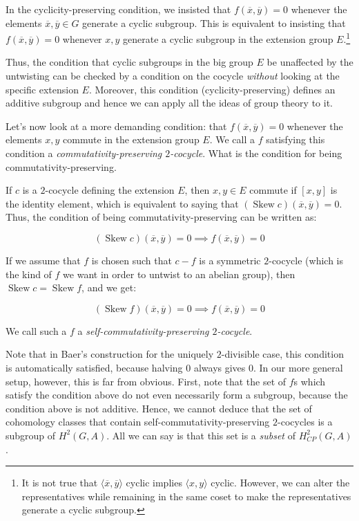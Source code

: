 \documentclass[10pt]{amsart}
\newcommand{\Skew}{\operatorname{Skew}}
\begin{document}
In the cyclicity-preserving condition, we insisted that
$f(\overline{x},\overline{y}) = 0$ whenever the elements
$\overline{x},\overline{y} \in G$ generate a cyclic subgroup. This is
equivalent to insisting that $f(\overline{x},\overline{y}) = 0$
whenever $x,y$ generate a cyclic subgroup in the extension group
$E$.\footnote{It is not true that $\langle \overline{x},\overline{y}
\rangle$ cyclic implies $\langle x,y \rangle$ cyclic. However, we can
alter the representatives while remaining in the same coset to make
the representatives generate a cyclic subgroup.}

Thus, the condition that cyclic subgroups in the big group $E$ be
unaffected by the untwisting can be checked by a condition on the
cocycle {\em without} looking at the specific extension $E$. Moreover,
this condition (cyclicity-preserving) defines an additive subgroup and
hence we can apply all the ideas of group theory to it.

Let's now look at a more demanding condition: that
$f(\overline{x},\overline{y}) = 0$ whenever the elements $x,y$ commute
in the extension group $E$. We call a $f$ satisfying this condition a
{\em commutativity-preserving $2$-cocycle}. What is the condition for
being commutativity-preserving.

If $c$ is a $2$-cocycle defining the extension $E$, then $x,y \in E$
commute if $[x,y]$ is the identity element, which is equivalent to
saying that $(\Skew c)(\overline{x},\overline{y}) = 0$. Thus, the
condition of being commutativity-preserving can be written as:

$$(\Skew c)(\overline{x},\overline{y}) = 0 \implies f(\overline{x},\overline{y}) = 0$$

If we assume that $f$ is chosen such that $c - f$ is a symmetric
$2$-cocycle (which is the kind of $f$ we want in order to untwist to
an abelian group), then $\Skew c = \Skew f$, and we get:

$$(\Skew f)(\overline{x},\overline{y}) = 0 \implies f(\overline{x},\overline{y}) = 0$$

We call such a $f$ a {\em self-commutativity-preserving $2$-cocycle}.

Note that in Baer's construction for the uniquely $2$-divisible case,
this condition is automatically satisfied, because halving $0$ always
gives $0$. In our more general setup, however, this is far from
obvious. First, note that the set of $f$s which satisfy the condition
above do not even necessarily form a subgroup, because the condition
above is not additive. Hence, we cannot deduce that the set of
cohomology classes that contain self-commutativity-preserving
$2$-cocycles is a subgroup of $H^2(G,A)$. All we can say is that this
set is a {\em subset} of $H^2_{CP}(G,A)$.
\end{document}
